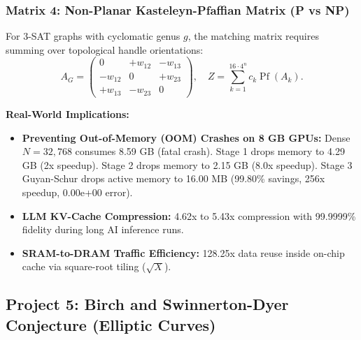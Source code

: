 \documentclass[11pt,a4paper]{article}
\begin{document}
\subsubsection{Matrix 4: Non-Planar Kasteleyn-Pfaffian Matrix (P vs NP)}
For 3-SAT graphs with cyclomatic genus $g$, the matching matrix requires summing over topological handle orientations:
\begin{equation}
A_G = \begin{pmatrix} 0 & +w_{12} & -w_{13} \\ -w_{12} & 0 & +w_{23} \\ +w_{13} & -w_{23} & 0 \end{pmatrix}, \quad Z = \sum_{k=1}^{16 \cdot 4^n} c_k \operatorname{Pf}(A_k).
\end{equation}

\noindent\textbf{Real-World Implications:}
\begin{itemize}
    \item \textbf{Preventing Out-of-Memory (OOM) Crashes on 8 GB GPUs:} Dense $N=32,768$ consumes 8.59 GB (fatal crash). Stage 1 drops memory to 4.29 GB (2x speedup). Stage 2 drops memory to 2.15 GB (8.0x speedup). Stage 3 Guyan-Schur drops active memory to 16.00 MB (99.80\% savings, 256x speedup, 0.00e+00 error).
    \item \textbf{LLM KV-Cache Compression:} 4.62x to 5.43x compression with 99.9999\% fidelity during long AI inference runs.
    \item \textbf{SRAM-to-DRAM Traffic Efficiency:} 128.25x data reuse inside on-chip cache via square-root tiling ($\sqrt{X}$).
\end{itemize}

\newpage

\subsection{Project 5: Birch and Swinnerton-Dyer Conjecture (Elliptic Curves)}
\end{document}
